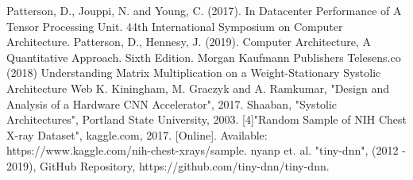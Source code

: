 \documentclass[11pt, conference, onecolumn]{IEEEtran}
\begin{document}
\begin{thebibliography}{00}
 Patterson, D., Jouppi, N. and Young, C. (2017). In Datacenter Performance of A Tensor Processing Unit. 44th International Symposium on Computer Architecture.
 Patterson, D., Hennesy, J. (2019). Computer Architecture, A Quantitative Approach. Sixth Edition. Morgan Kaufmann Publishers
 Telesens.co (2018) Understanding Matrix Multiplication on a Weight-Stationary Systolic Architecture Web
 K. Kiningham, M. Graczyk and A. Ramkumar, "Design and Analysis of a Hardware CNN Accelerator", 2017.
 Shaaban, "Systolic Architectures", Portland State University, 2003.
 [4]"Random Sample of NIH Chest X-ray Dataset", kaggle.com, 2017. [Online]. Available: https://www.kaggle.com/nih-chest-xrays/sample.
 nyanp et. al. "tiny-dnn", (2012 - 2019), GitHub Repository, https://github.com/tiny-dnn/tiny-dnn.
\end{thebibliography}
\end{document}
